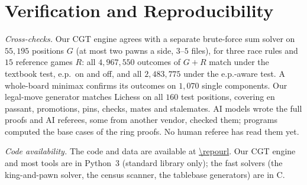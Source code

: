 \providecommand{\codeavail}{available at \expandafter\url\expandafter{\repourl}}

\section{Verification and Reproducibility}\label{sec:verify}

\emph{Cross-checks.} Our CGT engine agrees with a separate brute-force sum solver on $55{,}195$ positions $G$
(at most two pawns a side, $3$--$5$ files), for three race rules and $15$ reference games $R$: all
$4{,}967{,}550$ outcomes of $G+R$ match under the textbook test, e.p.\ on and off, and all $2{,}483{,}775$
under the e.p.-aware test. A whole-board minimax confirms its outcomes on $1{,}070$ single components. Our
legal-move generator matches Lichess on all $160$ test positions, covering en passant, promotions, pins, checks,
mates and stalemates. AI models wrote the full  proofs and AI referees, some from another vendor, checked them;
programs computed the base cases of the ring proofs. No human referee has read them yet.

\emph{Code availability.} The code and data are \codeavail. Our CGT engine and most tools are in
Python~3 (standard library only); the fast solvers (the king-and-pawn solver, the census scanner, the tablebase
generators) are in C.
